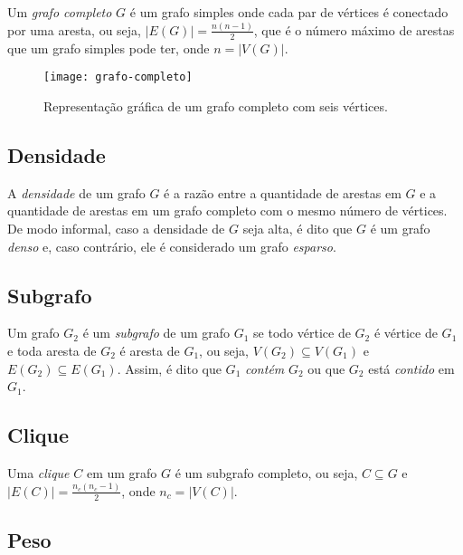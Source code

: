 Um \emph{grafo completo} $G$ é um grafo simples onde cada par de vértices é conectado por uma aresta, ou seja, $|E(G)| = \frac{n(n-1)}{2}$, que é o número máximo de arestas que um grafo simples pode ter, onde $n = |V(G)|$.

\begin{figure}[h]
\texttt{[image: grafo-completo]}
\centering
\caption{Representação gráfica de um grafo completo com seis vértices.}
\end{figure}

\subsection{Densidade}
\label{conceitos__grafo--densidade}

A \emph{densidade} de um grafo $G$ é a razão entre a quantidade de arestas em $G$ e a quantidade de arestas em um grafo completo com o mesmo número de vértices. De modo informal, caso a densidade de $G$ seja alta, é dito que $G$ é um grafo \emph{denso} e, caso contrário, ele é considerado um grafo \emph{esparso}.

\subsection{Subgrafo}
\label{conceitos__grafo--subgrafo}

Um grafo $G_2$ é um \emph{subgrafo} de um grafo $G_1$ se todo vértice de $G_2$ é vértice de $G_1$  e toda aresta de $G_2$ é aresta de $G_1$, ou seja, $V(G_2) \subseteq V(G_1)$ e $E(G_2) \subseteq E(G_1)$. Assim, é dito que $G_1$ \emph{contém} $G_2$ ou que $G_2$ está \emph{contido} em $G_1$.

\subsection{Clique}
\label{conceitos__grafo--clique}

Uma \emph{clique} $C$ em um grafo $G$ é um subgrafo completo, ou seja, $C \subseteq G$ e $|E(C)| = \frac{n_c(n_c-1)}{2}$, onde $n_c = |V(C)|$.


\subsection{Peso}
\label{conceitos__grafo--peso}

